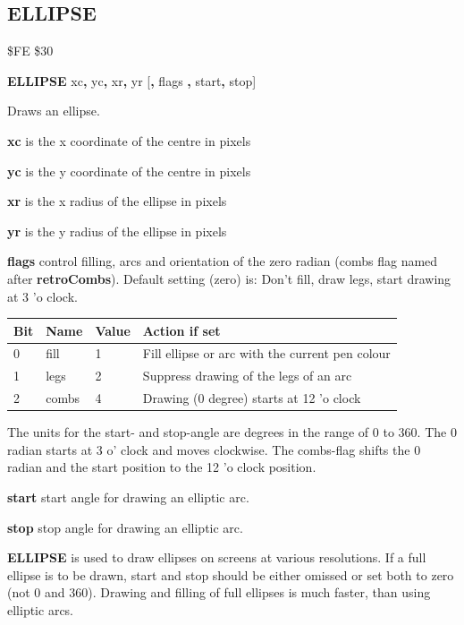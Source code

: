 \subsection{ELLIPSE}
\begin{description}[leftmargin=2cm,style=nextline]
\item [Token:] \$FE \$30
\item [Format:] {\bf ELLIPSE} xc{\bf,} yc{\bf,} xr{\bf,} yr
		[{\bf,} flags {\bf,} start{\bf,} stop]
\item [Usage:] Draws an ellipse.

               {\bf xc} is the x coordinate of the centre in pixels

               {\bf yc} is the y coordinate of the centre in pixels

               {\bf xr} is the x radius of the ellipse in pixels

               {\bf yr} is the y radius of the ellipse in pixels

               {\bf flags} control filling, arcs and orientation
               of the zero radian (combs flag named after {\bf retroCombs}).
               Default setting (zero) is: Don't fill, draw legs,
               start drawing at 3 'o clock.

{\setlength{\tabcolsep}{1.5mm}
\begin{tabular}{|l|l|l|l|}
\hline
{\bf Bit}  & {\bf Name} & {\bf Value} & {\bf Action if set} \\
\hline
  0 & fill  & 1  & Fill ellipse or arc with the current pen colour \\
  1 & legs  & 2  & Suppress drawing of the legs of an arc \\
  2 & combs & 4  & Drawing (0 degree) starts at 12 'o clock \\
\hline
\end{tabular}
}

               The units for the start- and stop-angle are degrees
               in the range of 0 to 360. The 0 radian starts
               at 3 o' clock and moves clockwise. The combs-flag
               shifts the 0 radian and the start position to the
               12 'o clock position.

               {\bf start} start angle for drawing an elliptic arc.

               {\bf stop} stop angle for drawing an elliptic arc.

\item [Remarks:] {\bf ELLIPSE} is used to draw ellipses on
               screens at various resolutions.
               If a full ellipse is to be drawn, start and stop should
               be either omissed or set both to zero
               (not 0 and 360). Drawing and filling of full ellipses is
               much faster, than using elliptic arcs.


\end{description}
